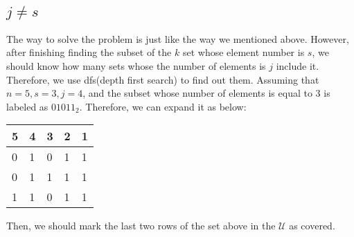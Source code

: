 \subsection{$j \neq s$}
    The way to solve the problem is just like the way we mentioned above. However, after finishing finding the subset of the $k$ set whose element number is $s$, we should know how many sets 
    whose the number of elements is $j$ include it. Therefore, we use dfs(depth first search) to find out them.
    Assuming that $n=5, s=3, j=4$, and the subset whose number of elements is equal to 3 is labeled as $01011_2$. Therefore, we can expand it as below:
    \begin{table}[H]
        \centering
        \begin{tabular}{lllll}
        \hline
        \multicolumn{1}{|l|}{5} & \multicolumn{1}{l|}{4} & \multicolumn{1}{l|}{3} & \multicolumn{1}{l|}{2} & \multicolumn{1}{l|}{1} \\ \hline
        0                       & 1                      & 0                      & 1                      & 1                      \\
        0                       & 1                      & 1                      & 1                      & 1                      \\
        1                       & 1                      & 0                      & 1                      & 1                     
        \end{tabular}
        \end{table}
    Then, we should mark the last two rows of the set above in the $\mathcal{U}$ as covered.